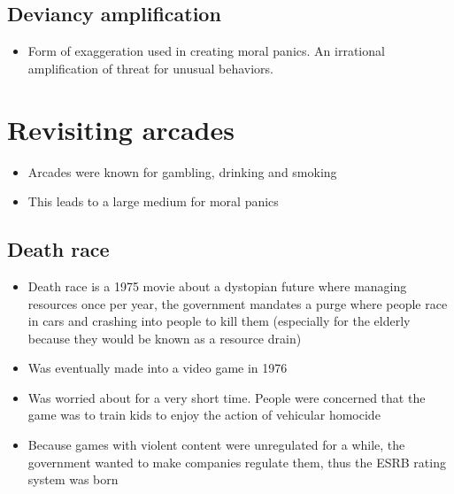 \documentclass[12pt]{book}
\begin{document}
\subsection{Deviancy amplification}

\begin{itemize}
    \item Form of exaggeration used in creating moral panics. An irrational amplification of threat for unusual behaviors.
\end{itemize}

\section{Revisiting arcades}

\begin{itemize}
    \item Arcades were known for gambling, drinking and smoking
    \item This leads to a large medium for moral panics
\end{itemize}

\subsection{Death race}

\begin{itemize}
    \item Death race is a 1975 movie about a dystopian future where managing resources once per year, the government mandates a purge where people race in cars and crashing into people to kill them (especially for the elderly because they would be known as a resource drain)
    \item Was eventually made into a video game in 1976
    \item Was worried about for a very short time. People were concerned that the game was to train kids to enjoy the action of vehicular homocide
    \item Because games with violent content were unregulated for a while, the government wanted to make companies regulate them, thus the ESRB rating system was born
\end{itemize}
\end{document}
